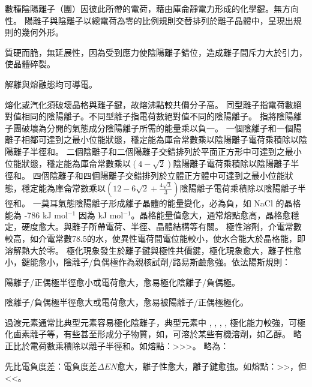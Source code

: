 \documentclass[a4paper,12pt]{report}
\begin{document}
數種陰陽離子（團）因彼此所帶的電荷，藉由庫侖靜電力形成的化學鍵。無方向性。
陽離子與陰離子以總電荷為零的比例規則交替排列於離子晶體中，呈現出規則的幾何外形。
\bit
\item 質硬而脆，無延展性，因為受到應力使陰陽離子錯位，造成離子間斥力大於引力，使晶體碎裂。
\item 解離與熔融態均可導電。
\item 熔化或汽化須破壞晶格與離子鍵，故熔沸點較共價分子高。
\eit
{}
同型離子指電荷數絕對值相同的陰陽離子。不同型離子指電荷數絕對值不同的陰陽離子。
指將陰陽離子團破壞為分開的氣態成分陰陽離子所需的能量乘以負一。
一個陰離子和一個陽離子相鄰可達到之最小位能狀態，穩定能為庫侖常數乘以陰陽離子電荷乘積除以陰陽離子半徑和。
二個陰離子和二個陽離子交錯排列於平面正方形中可達到之最小位能狀態，穩定能為庫侖常數乘以$(4-\sqrt{2})$陰陽離子電荷乘積除以陰陽離子半徑和。
四個陰離子和四個陽離子交錯排列於立體正方體中可達到之最小位能狀態，穩定能為庫侖常數乘以$(12-6\sqrt{2}+\frac{4\sqrt{3}}{3})$陰陽離子電荷乘積除以陰陽離子半徑和。
一莫耳氣態陰陽離子形成離子晶體的能量變化，必為負，如 NaCl 的晶格能為 -786 kJ mol$^{-1}$ 因為  kJ mol$^{-1}$。晶格能量值愈大，通常熔點愈高，晶格愈穩定，硬度愈大。與離子所帶電荷、半徑、晶體結構等有關。
極性溶劑，介電常數較高，如介電常數78.5的水，使異性電荷間電位能較小，使水合能大於晶格能，即溶解熱大於零。
極化現象發生於離子鍵與極性共價鍵，極化現象愈大，離子性愈小，鍵能愈小，陰離子/負偶極作為親核試劑/路易斯鹼愈強。依法陽斯規則：
\bit
\item 陽離子/正偶極半徑愈小或電荷愈大，愈易極化陰離子/負偶極。
\item 陰離子/負偶極半徑愈大或電荷愈大，愈易被陽離子/正偶極極化。
\item 過渡元素通常比典型元素容易極化陰離子，典型元素中 , , , ,  極化能力較強，可極化鹵素離子等，有些甚至形成分子物質，如，可溶於某些有機溶劑，如乙醇。
\eit
{}
略正比於電荷數乘積除以離子半徑和。如熔點：>>>。
略為：
\bit
\item 先比電負度差：電負度差$\Delta EN$愈大，離子性愈大，離子鍵愈強。如熔點：>>，但 <<。
\end{document}
